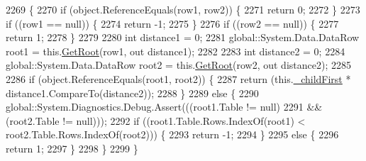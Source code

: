 \begin{DoxyCode}
2269                                                                                                \{
2270                 \textcolor{keywordflow}{if} (\textcolor{keywordtype}{object}.ReferenceEquals(row1, row2)) \{
2271                     \textcolor{keywordflow}{return} 0;
2272                 \}
2273                 \textcolor{keywordflow}{if} ((row1 == null)) \{
2274                     \textcolor{keywordflow}{return} -1;
2275                 \}
2276                 \textcolor{keywordflow}{if} ((row2 == null)) \{
2277                     \textcolor{keywordflow}{return} 1;
2278                 \}
2279 
2280                 \textcolor{keywordtype}{int} distance1 = 0;
2281                 global::System.Data.DataRow root1 = this.\hyperlink{class_proyecto___integrador__3_1_1ds_usuarios_table_adapters_1_1_table_adapter_manager_1_1_self_reference_comparer_adbe612a7a1ed56040974c39de179a041}{GetRoot}(row1, out distance1);
2282 
2283                 \textcolor{keywordtype}{int} distance2 = 0;
2284                 global::System.Data.DataRow root2 = this.\hyperlink{class_proyecto___integrador__3_1_1ds_usuarios_table_adapters_1_1_table_adapter_manager_1_1_self_reference_comparer_adbe612a7a1ed56040974c39de179a041}{GetRoot}(row2, out distance2);
2285 
2286                 \textcolor{keywordflow}{if} (\textcolor{keywordtype}{object}.ReferenceEquals(root1, root2)) \{
2287                     \textcolor{keywordflow}{return} (this.\hyperlink{class_proyecto___integrador__3_1_1ds_usuarios_table_adapters_1_1_table_adapter_manager_1_1_self_reference_comparer_a0d9b911f3c6ab73098107a9d88aa85c6}{\_childFirst} * distance1.CompareTo(distance2));
2288                 \}
2289                 \textcolor{keywordflow}{else} \{
2290                     global::System.Diagnostics.Debug.Assert(((root1.Table != null) 
2291                                     && (root2.Table != null)));
2292                     \textcolor{keywordflow}{if} ((root1.Table.Rows.IndexOf(root1) < root2.Table.Rows.IndexOf(root2))) \{
2293                         \textcolor{keywordflow}{return} -1;
2294                     \}
2295                     \textcolor{keywordflow}{else} \{
2296                         \textcolor{keywordflow}{return} 1;
2297                     \}
2298                 \}
2299             \}
\end{DoxyCode}
